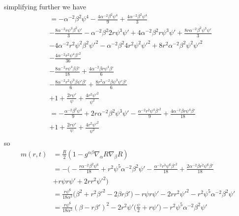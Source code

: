 \documentclass[12pt]{article}
\numberwithin{equation}{section}
\begin{document}
simplifying further we have
\begin{equation}
\begin{aligned}
&=-\alpha^{-2} \beta^2 \psi^4 - \frac{4 \alpha^{-2} \beta^2 \psi^4}{9} + \frac{4 \alpha^{-2} \beta^2 \psi^4}{3} \\
&- \frac{8 \alpha^{-2} r \psi^3 \beta^2  \psi'}{3} - \alpha^{-2} \beta^2 2 r \psi^3 \psi' + 4 \alpha^{-2} \beta^2 r \psi^3 \psi' + \frac{8 r \alpha^{-2} \beta^2 \psi^3 \psi'}{3}\\
&- 4 \alpha^{-2} r^2 \psi^2 \beta^2 \psi'^2  - \alpha^{-2} \beta^2 4 r^2 \psi^2 \psi'^2 + 8 r^2 \alpha^{-2} \beta^2 \psi^2 \psi'^2 \\
&- \frac{4 \alpha^{-2} r^2 \psi^4 \beta'^2}{36} \\
&- \frac{8 \alpha^{-2} r \psi^4 \beta \beta'}{18} + \frac{4 \alpha^{-2} \beta r \psi^4 \beta'}{6} \\
&- \frac{8 \alpha^{-2} r^2 \psi^3 \beta \psi' \beta'}{6} + \frac{8 r^2 \alpha^{-2} \beta \psi^3 \psi' \beta'}{6} \\
&+ 1 + \frac{2 r \psi'}{\psi} + \frac{4 r^2 \psi'^2}{\psi^2} \\
&=-\frac{\alpha^{-2} \beta^2 \psi^4}{9} + 2 r \alpha^{-2} \beta^2 \psi^3 \psi' - \frac{\alpha^{-2} r^2 \psi^4 \beta'^2}{9} + \frac{4 \alpha^{-2} \beta r \psi^4 \beta'}{18} \\
&+ 1 + \frac{2 r \psi'}{\psi} + \frac{4 r^2 \psi'^2}{\psi^2} \\
\end{aligned}
\end{equation}
so
\begin{equation}
\begin{aligned}
m(r, t) &= \frac{R}{2} (1 - g^{\alpha \beta} \nabla_\alpha R \nabla_\beta R) \\
&= - \Big( -\frac{r \alpha^{-2} \beta^2 \psi^6}{18} + r^2 \psi^5 \alpha^{-2} \beta^2 \psi' - \frac{\alpha^{-2} r^3 \psi^6 \beta'^2}{18} + \frac{2 \alpha^{-2} \beta r^2 \psi^6 \beta'}{18} \\
&+ r \psi r \psi' + 2 r r^2 \psi'^2  \Big) \\
&= \frac{r \psi^6}{18 \alpha^2} \Big( \beta^2 + r^2 \beta'^2 - 2 \beta r \beta' \Big) - r \psi r \psi' - 2 r r^2 \psi'^2 - r^2 \psi^5 \alpha^{-2} \beta^2 \psi' \\
&= \frac{r \psi^6}{18 \alpha^2} (\beta - r \beta')^2 - 2 r^2 \psi' \Big( \frac{\psi}{2} + r \psi' \Big) - r^2 \psi^5 \alpha^{-2} \beta^2 \psi' \\
\end{aligned}
\end{equation}
\end{document}

